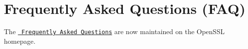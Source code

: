 \chapter{Frequently Asked Questions (FAQ)}
\hypertarget{md__c_1_2_users_2namph_2_downloads_2openssl_2openssl-3_82_81_2_f_a_q}{}\label{md__c_1_2_users_2namph_2_downloads_2openssl_2openssl-3_82_81_2_f_a_q}
The \href{https://www.openssl.org/docs/faq.html}{\texttt{ Frequently Asked Questions}} are now maintained on the Open\+SSL homepage. 
